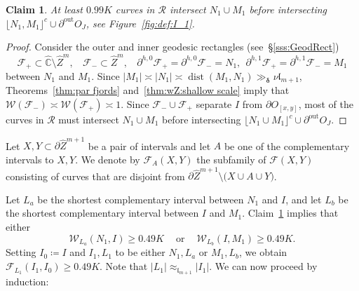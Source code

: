 \documentclass{amsart}
\renewcommand{\sp}{{\ \ }}
\newcommand{\1}{{\mathbb 1 }}
\newcommand{\Fam}{{\mathcal F}}
\newcommand{\Width}{{\mathcal W}}
\newcommand\RR{\mathcal{R}}
\newcommand{\wZ}{{\widehat Z}}
\newcommand{\length}{{\mathfrak l}}
\newcommand\out{{\operatorname{out}}}
\newtheorem{claim5}{Claim}
\newcommand{\wC}{\widehat{\mathbb{C}}}
\theoremstyle{remark}
\numberwithin{equation}{section}
\theoremstyle{definition}
\newcommand{\dist}{\operatorname{dist}}
\newcommand{\bdelta}{{\boldsymbol{ \delta}}}
\begin{document}
\begin{claim5}
\label{cl5:I_1}
At least $0.99 K$ curves in $\RR$ intersect $N_1\cup M_1$ before intersecting \newline${\lfloor N_1, M_1\rfloor^c\cup \partial^\out O_J}$, see Figure~\ref{fig:def:I_1}.
 \end{claim5}
\begin{proof}
Consider the outer and inner geodesic rectangles (see~\S\ref{sss:GeodRect}) \[\Fam_+\subset \wC\setminus \wZ^m,\sp \sp \Fam_-\subset \wZ^m,\sp\sp \partial ^{h,0}\Fam_+=\partial ^{h,0}\Fam_- = N_1,\sp  \partial ^{h,1}\Fam_+=\partial ^{h,1}\Fam_- = M_1\] between $N_1$ and $M_1$.  Since $|M_1|\asymp |N_1|\asymp \dist(M_1,N_1)\gg_{\bdelta} \nu\length_{m+1}$, Theorems~\ref{thm:par fjords} and~\ref{thm:wZ:shallow scale} imply that
$\Width(\Fam_-)\asymp \Width(\Fam_+)\asymp 1.$
Since $\Fam_-\cup \Fam_+$ separate $I$ from $\partial O_{[x,y]}$, most of the curves in $\RR$ must intersect $N_1\cup M_1$ before intersecting $\lfloor N_1\cup M_1\rfloor^c \cup \partial^\out O_J$.
\end{proof}


 Let $X,Y\subset\partial \wZ^{m+1}$ be a pair of intervals and let $A$ be one of the complementary intervals to $X,Y$. We denote by $\Fam_A(X,Y)$ the subfamily of $\Fam(X,Y)$ consisting of curves that are disjoint from $\partial \wZ^{m+1}\setminus \big(X\cup A\cup Y\big)$.  



Let $L_a$ be the shortest complementary interval between $N_1$ and $I$, and let $L_b$ be the shortest complementary interval between $I$ and $M_1$. Claim~\ref{cl5:I_1} implies that either \[\Width _{L_a}(N_1, I)\ge 0.49 K\sp\sp\text{ or }\sp\sp \Width _{L_b}(I,M_1)\ge 0.49 K.\]
Setting $I_0\coloneqq I$ and $I_1, L_1$ to be either $N_1, L_a$ or $M_1, L_b$, we obtain $\Fam _{L_1}(I_1, I_0) \ge 0.49 K$. Note that $|L_1|\approx_{\length_{m+1}} |I_1|$. We can now proceed by induction:
\end{document}
